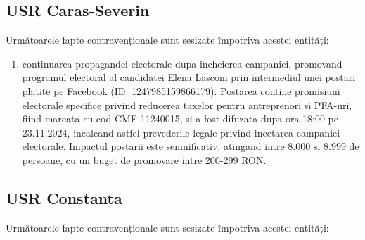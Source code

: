 \documentclass[a4paper,12pt]{article}
\begin{document}
\vspace{0.5cm}

\subsection{USR Caras-Severin}
Următoarele fapte contravenționale sunt sesizate împotriva acestei entități:

\begin{enumerate}[leftmargin=*, label=\arabic*.)]
    \item continuarea propagandei electorale dupa incheierea campaniei, promovand programul electoral al candidatei Elena Lasconi prin intermediul unei postari platite pe Facebook (ID: \href{https://www.facebook.com/ads/library/?id=1247985159866179}{1247985159866179}). Postarea contine promisiuni electorale specifice privind reducerea taxelor pentru antreprenori si PFA-uri, fiind marcata cu cod CMF 11240015, si a fost difuzata dupa ora 18:00 pe 23.11.2024, incalcand astfel prevederile legale privind incetarea campaniei electorale. Impactul postarii este semnificativ, atingand intre 8.000 si 8.999 de persoane, cu un buget de promovare intre 200-299 RON.
\end{enumerate}

\vspace{0.5cm}

\subsection{USR Constanta}
Următoarele fapte contravenționale sunt sesizate împotriva acestei entități:
\end{document}
